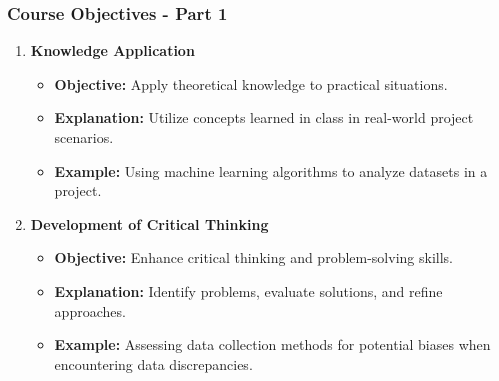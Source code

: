 \documentclass[aspectratio=169]{beamer}
\begin{document}
\begin{frame}[fragile]
    \frametitle{Course Objectives - Part 1}
    \begin{enumerate}
        \item \textbf{Knowledge Application} 
        \begin{itemize}
            \item \textbf{Objective:} Apply theoretical knowledge to practical situations.
            \item \textbf{Explanation:} Utilize concepts learned in class in real-world project scenarios.
            \item \textbf{Example:} Using machine learning algorithms to analyze datasets in a project.
        \end{itemize}

        \item \textbf{Development of Critical Thinking} 
        \begin{itemize}
            \item \textbf{Objective:} Enhance critical thinking and problem-solving skills.
            \item \textbf{Explanation:} Identify problems, evaluate solutions, and refine approaches.
            \item \textbf{Example:} Assessing data collection methods for potential biases when encountering data discrepancies.
        \end{itemize}
    \end{enumerate}
\end{frame}
\end{document}
